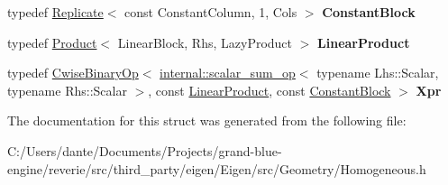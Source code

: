 \begin{DoxyCompactItemize}
\mbox{\label{struct_eigen_1_1internal_1_1homogeneous__left__product__refactoring__helper_acc234155d82f5ea0758b836ae197266e}} 
typedef \mbox{\hyperlink{class_eigen_1_1_replicate}{Replicate}}$<$ const Constant\+Column, 1, Cols $>$ {\bfseries Constant\+Block}
\item 
\mbox{\label{struct_eigen_1_1internal_1_1homogeneous__left__product__refactoring__helper_a97831c144fe512df2f7b5ec49b84252a}} 
typedef \mbox{\hyperlink{class_eigen_1_1_product}{Product}}$<$ Linear\+Block, Rhs, Lazy\+Product $>$ {\bfseries Linear\+Product}
\item 
\mbox{\label{struct_eigen_1_1internal_1_1homogeneous__left__product__refactoring__helper_a68553e6f8fe9b5704607444a3fc1f96e}} 
typedef \mbox{\hyperlink{class_eigen_1_1_cwise_binary_op}{Cwise\+Binary\+Op}}$<$ \mbox{\hyperlink{struct_eigen_1_1internal_1_1scalar__sum__op}{internal\+::scalar\+\_\+sum\+\_\+op}}$<$ typename Lhs\+::\+Scalar, typename Rhs\+::\+Scalar $>$, const \mbox{\hyperlink{class_eigen_1_1_product}{Linear\+Product}}, const \mbox{\hyperlink{class_eigen_1_1_replicate}{Constant\+Block}} $>$ {\bfseries Xpr}
\end{DoxyCompactItemize}


The documentation for this struct was generated from the following file\+:\begin{DoxyCompactItemize}
\item 
C\+:/\+Users/dante/\+Documents/\+Projects/grand-\/blue-\/engine/reverie/src/third\+\_\+party/eigen/\+Eigen/src/\+Geometry/Homogeneous.\+h\end{DoxyCompactItemize}
